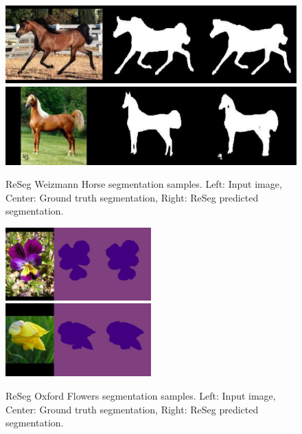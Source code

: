 
\begin{figure}[t!]
    \centering
    \includegraphics[width=\textwidth]{img/reseg/samples/horse1.pdf}\\
    \vspace{0.1em}
    \includegraphics[width=\textwidth]{img/reseg/samples/horse2.pdf}
    \caption{ReSeg Weizmann Horse segmentation samples.
        Left: Input image, Center: Ground truth segmentation,
        Right: ReSeg predicted segmentation.}
    \label{fig:reseg_samples_horses}
\end{figure}

\begin{figure}[t!]
    \centering
    \includegraphics[width=0.5\textwidth]{img/reseg/samples/flowers1.jpg}\\
    \vspace{0.1em}
    \includegraphics[width=0.5\textwidth]{img/reseg/samples/flowers2.jpg}
    \caption{ReSeg Oxford Flowers segmentation samples.
        Left: Input image, Center: Ground truth segmentation,
        Right: ReSeg predicted segmentation.}
    \label{fig:reseg_samples_flowers}
\end{figure}

